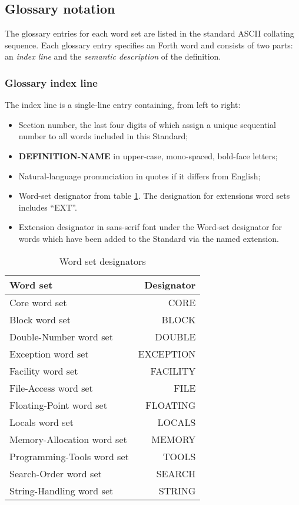 \subsection{Glossary notation}

The glossary entries for each word set are listed in the standard
ASCII collating sequence. Each glossary entry specifies an 
Forth word and consists of two parts:
an \emph{index line} and the \emph{semantic description} of the
definition.

\subsubsection{Glossary index line}

The index line is a single-line entry containing, from left to right:

\begin{itemize}
\item Section number, the last four digits of which assign a
	unique sequential number to all words included in this Standard;

\item \textbf{DEFINITION-NAME} in upper-case, mono-spaced,
	bold-face letters;

\item Natural-language pronunciation in quotes if it differs from English;

\item Word-set designator from table \ref{table:wordsets}.
	The designation for extensions word sets includes ``EXT''.

\item \textsf{Extension designator} in sans-serif font under the
	Word-set designator for words which have been added to the
	Standard via the named extension.
\end{itemize}

\begin{table}[ht]
  \begin{center}
	\caption{Word set designators}
	\label{table:wordsets}
	\begin{tabular}{lr}
	\hline\hline
	Word set & Designator \\
	\hline
	Core word set				& CORE		\\
	Block word set				& BLOCK		\\
	Double-Number word set		& DOUBLE	\\
	Exception word set			& EXCEPTION	\\
	Facility word set			& FACILITY	\\
	File-Access word set		& FILE		\\
	Floating-Point word set		& FLOATING	\\
	Locals word set				& LOCALS	\\
	Memory-Allocation word set	& MEMORY	\\
	Programming-Tools word set	& TOOLS		\\
	Search-Order word set		& SEARCH	\\
	String-Handling word set	& STRING	\\
	\hline\hline
	\end{tabular}
  \end{center}
\end{table}


